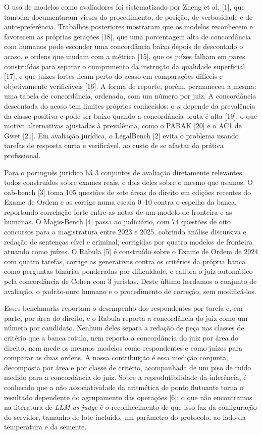 \documentclass{IOS-Book-Article}
\begin{document}
O uso de modelos como avaliadores foi sistematizado por Zheng et al. [1], que também documentaram vieses do procedimento, de posição, de verbosidade e de auto-preferência. Trabalhos posteriores mostraram que os modelos reconhecem e favorecem as próprias gerações [18], que uma porcentagem alta de concordância com humanos pode esconder uma concordância baixa depois de descontado o acaso, e ordens que mudam com a métrica [15], que os juízes falham em pares construídos para separar o cumprimento da instrução da qualidade superficial [17], e que juízes fortes ficam perto do acaso em comparações difíceis e objetivamente verificáveis [16]. A forma de reporte, porém, permaneceu a mesma: uma tabela de concordância, ordenada, com um número por juiz. A concordância descontada do acaso tem limites próprios conhecidos: o $\kappa$ depende da prevalência da classe positiva e pode ser baixo quando a concordância bruta é alta [19], o que motiva alternativas ajustadas à prevalência, como o PABAK [20] e o AC1 de Gwet [21]. Em avaliação jurídica, o LegalBench [2] evita o problema usando tarefas de resposta curta e verificável, ao custo de se afastar da prática profissional.

Para o português jurídico há 3 conjuntos de avaliação diretamente relevantes, todos construídos sobre exames reais, e dois deles sobre o mesmo que usamos. O oab-bench [3] toma 105 questões de sete áreas do direito em edições recentes do Exame de Ordem e as corrige numa escala 0--10 contra o espelho da banca, reportando correlação forte entre as notas de um modelo de fronteira e as humanas. O Magis-Bench [4] passa ao judiciário, com 74 questões de oito concursos para a magistratura entre 2023 e 2025, cobrindo análise discursiva e redação de sentenças cível e criminal, corrigidas por quatro modelos de fronteira atuando como juízes. O Rabula [5] é construído sobre o Exame de Ordem de 2024 com quatro tarefas, corrige as generativas contra os critérios da própria banca como perguntas binárias ponderadas por dificuldade, e calibra o juiz automático pela concordância de Cohen com 3 juristas. Deste último herdamos o conjunto de avaliação, o padrão-ouro humano e o procedimento de correção, sem modificá-los.

Esses benchmarks reportam o desempenho dos respondentes por tarefa e, em parte, por área do direito, e o Rabula reporta a concordância do juiz como um número por candidato. Nenhum deles separa a redação de peça nas classes de critério que a banca rotula, nem reporta a concordância do juiz por área do direito, nem mede os mesmos modelos como respondentes e como juízes para comparar as duas ordens. A nossa contribuição é essa medição conjunta, decomposta por área e por classe de critério, acompanhada de um piso de ruído medido para a concordância do juiz. Sobre a reprodutibilidade da inferência, é conhecido que a não associatividade da aritmética de ponto flutuante torna o resultado dependente do agrupamento das operações [6]; o que não encontramos na literatura de \emph{LLM-as-judge} é o reconhecimento de que isso faz da configuração do servidor, tamanho de lote incluído, um parâmetro do protocolo, ao lado da temperatura e da semente.
\end{document}
